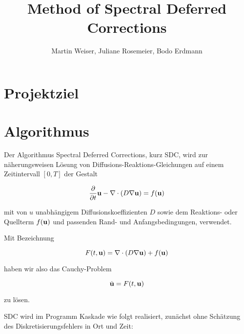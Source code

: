 \documentclass[10pt,twoside,a4paper, openany]{article}
\begin{document}
\title{Method of Spectral Deferred Corrections}
\author{Martin Weiser, Juliane Rosemeier, Bodo Erdmann}
\maketitle
\section{Projektziel}



\section{Algorithmus}
Der Algorithmus Spectral Deferred Corrections, kurz SDC, wird zur näherungsweisen Lösung
von Diffusions-Reaktions-Gleichungen  auf einem Zeitintervall $[0,T]$ der Gestalt

\begin{equation}
  \frac{\partial}{\partial t} {\bf u} - \nabla \cdot (D \nabla {\bf u}) = f({\bf u}) \label{eq:heateq}
\end{equation}

\noindent mit von $u$ unabhängigem Diffusionskoeffizienten $D$ sowie dem Reaktions- oder Quellterm $f({\bf u})$ und
passenden Rand- und Anfangsbedingungen, verwendet.
 
Mit Bezeichnung

\[
F(t,{\bf u}) = \nabla \cdot (D \nabla {\bf u}) + f({\bf u})
\] 

\noindent haben wir also das Cauchy-Problem

\[
\dot{{\bf u}} = F(t,{\bf u})
\]

\noindent zu lösen.
 
\vspace{1cm}

\noindent SDC wird im Programm {\sc Kaskade} wie folgt realisiert, zunächst ohne Schätzung des
Diskretisierungsfehlers in Ort und Zeit:
\end{document}
